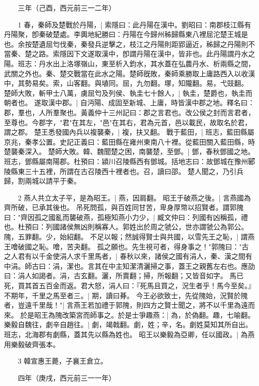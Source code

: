 　　三年（己酉，西元前三一二年）

　　1 春，秦師及楚戰於丹陽，|{
	索隱曰：此丹陽在漢中。劉昭曰：南郡枝江縣有丹陽聚，卽秦破楚處。李輿地紀勝曰：丹陽在今歸州秭歸縣東八裡屈沱楚王城是也。余按楚遺屈匄伐秦，秦發兵逆擊之，枝江之丹陽則距郢逼近，秭歸之丹陽則不當秦、楚之路。索隱因下文遂取漢中，卽謂丹陽在漢中，皆非也。此丹陽謂丹水之陽。班志：丹水出上洛塚嶺山，東至析入鈞水，其水蓋在弘農丹水、析兩縣之間，武關之外也。秦、楚交戰當在此水之陽。楚師旣敗，秦師乘勝取上庸路西入以收漢中，其勢易矣。索，山客翻。與埴同。屈，九勿翻。塚，知隴翻。易，弋豉翻。
	}
楚師大敗，斬甲士八萬，虜屈匄及列侯、執圭七十餘人，|{
	執圭，楚爵也，執圭而朝者也。
	}
遂取漢中郡。|{
	自沔陽、成固至新城、上庸，時皆漢中郡之地。釋名曰：郡，羣也，人所羣聚也。黃義仲十三州記曰：郡之言君也。改公侯之封而言君者，至尊也。今郡字，"君"在其左，"邑"在其右，君為元首，邑以載民，故取名於君，謂之郡。
	}
楚王悉發國內兵以複襲秦，|{
	複，扶又翻。
	}
戰于藍田，|{
	班志，藍田縣屬京兆，秦孝公置。史記正義曰：藍田縣在雍州東南八十裡。從藍田關入藍田縣，時楚襲秦深入。
	}
楚師大敗。韓、魏聞楚之困，南襲楚，至鄧。|{
	鄧，春秋鄧國之地。班志，鄧縣屬南陽郡。杜預曰：潁川召陵縣西有鄧城。括地志曰：故鄧城在豫州郾陵縣東三十五裡，所謂在古召陵西十裡者也。召，讀曰邵。
	}
楚人聞之，乃引兵歸，割兩城以請平于秦。

　　2 燕人共立太子平，是為昭王。|{
	燕，因肩翻。
	}
昭王于破燕之後。|{
	言燕國為齊所破，已承其後也。
	}
吊死問孤，與百姓同甘苦，卑身厚幣以招賢者。謂郭隗曰："齊因孤之國亂而襲破燕，孤極知燕小力少，|{
	臧文仲曰：列國有凶稱孤，禮也。杜預曰：列國諸侯無凶則稱寡人。郭姓出於周之虢公，世亦謂虢公為郭公。隗，五罪翻。少，始紹翻。
	}
不足以報；然誠得賢士與共國，以雪先王之恥，|{
	謂燕王噲破國之恥。噲，苦夬翻。
	}
孤之願也。先生視可者，得身事之！"郭隗曰："古之人君有以千金使涓人求千里馬者，|{
	春秋以來，諸侯之國有涓人，秦、漢之間有中涓。師古曰：涓，潔也。言其在中主知潔清灑掃之事，蓋王之親舊左右也。應劭曰：涓人如謁者。涓，古玄翻。灑，所賣翻；掃，所報翻；又皆音如字。
	}
馬已死，買其首五百金而返。君大怒，涓人曰：『死馬且買之，況生者乎！馬今至矣。』不期年，千里之馬至者三。|{
	期，讀曰朞。
	}
今王必欲致士，先從隗始，況賢於隗者，豈遠千里哉！"|{
	言燕王若加禮于郭隗，則四方之賢士聞之，將不以千里為遠而來。
	}
於是昭王為隗改築宮而師事之。於是士爭趣燕：|{
	為，於偽翻。趣，七喻翻。
	}
樂毅自魏往，劇辛自趙往。|{
	劇，竭戟翻。劇，姓；辛，名。劇姓莫知其所自出。班志，北海郡有劇縣，蓋其先以縣為姓也。
	}
昭王以樂毅為亞卿，任以國政。|{
	為燕用樂毅破齊張本。
	}

　　3 韓宣惠王薨，子襄王倉立。

　　四年（庚戌，西元前三一一年）

